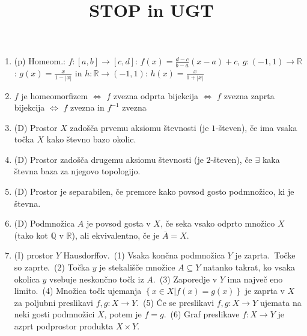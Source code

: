 \documentclass[10pt,a4paper]{article}
\title{STOP in UGT}
\author{}
\date{}
\begin{document}

\begin{enumerate} 
    \setlength\itemsep{-1px}%

\item (p) Homeom.: $f: [a,b]\to[c,d]$: $f(x)=\frac{d-c}{b-a}(x-a)+c$,
$g: (-1,1)\to\mathbb{R}$: $g(x)=\frac{x}{1-|x|}$ in 
$h: \mathbb{R}\to(-1,1)$: $h(x)=\frac{x}{1+|x|}$

\item \(f\) je homeomorfizem \(\iff\) \(f\) zvezna odprta bijekcija \(\iff\) \(f\) zvezna zaprta bijekcija \(\iff\) \(f\) zvezna in \(f^{-1}\) zvezna
            
\item (D) Prostor $X$ zadošča prvemu aksiomu števnosti (je $1$-števen), če ima vsaka točka $X$ kako števno bazo okolic.
            
\item (D) Prostor zadošča drugemu aksiomu števnosti (je $2$-števen), če $\exists$ kaka števna baza za njegovo topologijo.
            
\item (D) Prostor je separabilen, če premore kako povsod gosto podmnožico, ki je števna.
\item (D) Podmnožica $A$ je povsod gosta v $X$, če seka vsako odprto množico $X$ (tako kot $\mathbb{Q}$ v $\mathbb{R}$), ali ekvivalentno, če je $\overline{A}=X$.


\item (I)  prostor $Y$ Hausdorffov.~(1) Vsaka končna podmnožica $Y$ je zaprta.~Točke so zaprte.~(2) Točka $y$ je stekališče množice $A\subseteq Y$ natanko takrat, ko vsaka okolica $y$ vsebuje neskončno točk iz $A$.~(3) Zaporedje v $Y$ ima največ eno limito.~(4) Množica točk ujemanja $\left\{x\in X | f(x)=g(x)\right\}$ je zaprta v $X$ za poljubni preslikavi $f,g: X\to Y$.~(5) Če se preslikavi $f,g: X\to Y$ ujemata na neki gosti podmnožici $X$, potem je $f=g$.~(6) Graf preslikave $f: X\to Y$ je azprt podprostor produkta $X\times Y$.


\end{enumerate}
\end{document}

